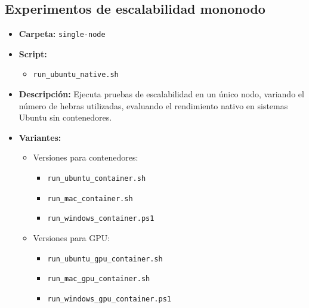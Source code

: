 \subsection{Experimentos de escalabilidad mononodo}
\begin{itemize}
    \item \textbf{Carpeta:} \texttt{single-node}
    \item \textbf{Script:}
          \begin{itemize}
              \item \texttt{run\_ubuntu\_native.sh}
          \end{itemize}
    \item \textbf{Descripción:} Ejecuta pruebas de escalabilidad en un único nodo, variando el número de hebras utilizadas, evaluando el rendimiento nativo en sistemas Ubuntu sin contenedores.
    \item \textbf{Variantes:}
          \begin{itemize}
              \item Versiones para contenedores:
                    \begin{itemize}
                        \item \texttt{run\_ubuntu\_container.sh}
                        \item \texttt{run\_mac\_container.sh}
                        \item \texttt{run\_windows\_container.ps1}
                    \end{itemize}
              \item Versiones para GPU:
                    \begin{itemize}
                        \item \texttt{run\_ubuntu\_gpu\_container.sh}
                        \item \texttt{run\_mac\_gpu\_container.sh}
                        \item \texttt{run\_windows\_gpu\_container.ps1}
                    \end{itemize}
          \end{itemize}
\end{itemize}

